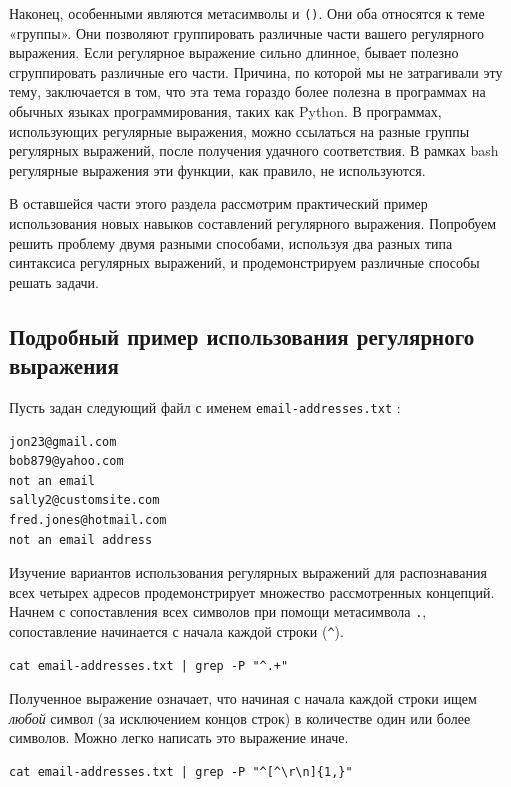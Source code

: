 \documentclass[a4paper,12pt,final,openany]{extbook}
\begin{document}
Наконец, особенными являются метасимволы
\texttt{\textbar{}} и \texttt{()}. Они оба относятся к теме
«группы». Они позволяют группировать различные части вашего
регулярного выражения. Если регулярное выражение сильно длинное, бывает
полезно сгруппировать различные его части. Причина, по которой мы не
затрагивали эту тему, заключается в том, что эта тема гораздо более
полезна в программах на обычных языках программирования, таких как Python.
В программах, использующих регулярные выражения, можно ссылаться на
разные группы регулярных выражений, после получения удачного
соответствия. В рамках bash регулярные выражения эти функции, как
правило, не используются.


В оставшейся части этого раздела рассмотрим практический пример
использования новых навыков составлений регулярного выражения. Попробуем
решить проблему двумя разными способами, используя два разных типа
синтаксиса регулярных выражений, и продемонстрируем различные способы
решать задачи.

\hypertarget{Detailed-Example-Regular-Expression}{%
\subsection{\texorpdfstring{\protect\hyperlink{Detailed-Example-Regular-Expression}{}Подробный
пример использования регулярного
выражения}{Подробный пример использования регулярного выражения}}\label{Detailed-Example-Regular-Expression}}

Пусть задан следующий файл с именем \texttt{email-addresses.txt} :
\begin{verbatim}
jon23@gmail.com
bob879@yahoo.com
not an email
sally2@customsite.com
fred.jones@hotmail.com
not an email address
\end{verbatim}
Изучение вариантов использования регулярных выражений для распознавания
всех четырех адресов продемонстрирует множество рассмотренных концепций.
Начнем с сопоставления всех символов при помощи метасимвола \texttt{.},
сопоставление начинается с начала каждой строки (\texttt{\^{}}).
\begin{verbatim}
cat email-addresses.txt | grep -P "^.+"
\end{verbatim}

Полученное выражение означает, что начиная с
начала каждой строки ищем \emph{любой} символ (за исключением концов
строк) в количестве один или более символов. Можно легко написать это
выражение иначе.
\begin{verbatim}
cat email-addresses.txt | grep -P "^[^\r\n]{1,}"
\end{verbatim}
\end{document}
